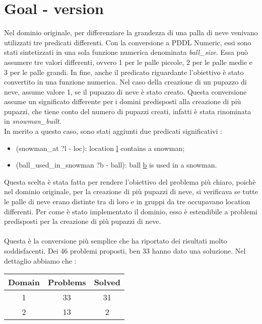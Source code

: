 \documentclass{article}
\begin{document}
\section*{Goal - version}
Nel dominio originale, per differenziare la grandezza di una palla di neve venivano utilizzati tre predicati differenti. Con la conversione a PDDL Numeric,
essi sono stati sintetizzati in una sola funzione numerica denominata \textit{ball\_size}. Essa può assumere tre valori differenti, ovvero 1 per le palle piccole, 2 per le palle medie e 3 per le palle grandi.
In fine, anche il predicato riguardante l'obiettivo è stato convertito in una funzione numerica. Nel caso della creazione di un pupazzo di neve, assume 
valore 1, se il pupazzo di neve è stato creato. Questa conversione assume un significato differente per i domini predisposti alla creazione di più pupazzi, che tiene conto del numero di pupazzi creati, infatti è stata rinominata in \textit{snowman\_built}.\\
In merito a questo caso, sono stati aggiunti due predicati significativi :\vspace{-0.15cm}
\begin{itemize}
    \item (snowman\_at ?l - loc): location \underline{l} contains a snowman; \vspace{-0.15cm}
    \item (ball\_used\_in\_snowman ?b - ball): ball \underline{b} is used in a snowman. \vspace{-0.15cm}
\end{itemize}
Questa scelta è stata fatta per rendere l'obiettivo del problema più chiaro, poichè nel dominio originale, 
per la creazione di più pupazzi di neve, si verificava se tutte le palle di neve erano distinte tra di loro e
in gruppi da tre occupavano location differenti. Per come è stato implementato il dominio, esso è estendibile a problemi
predisposti per la creazione di più pupazzi di neve.\\ \\
Questa è la conversione più semplice che ha riportato dei risultati molto soddisfacenti. Dei 46 problemi proposti, ben 33 hanno dato una soluzione. Nel dettaglio abbiamo che :\\
\begin{table}[H]
    \centering
    \begin{tabular}{|c|c|c|}
        \hline
        \textbf{Domain} & \textbf{Problems} & \textbf{Solved} \\
        \hline
        1 & 33 & 31 \\
        \hline
        2 & 13 & 2 \\
        \hline
    \end{tabular}
\end{table}
\end{document}

